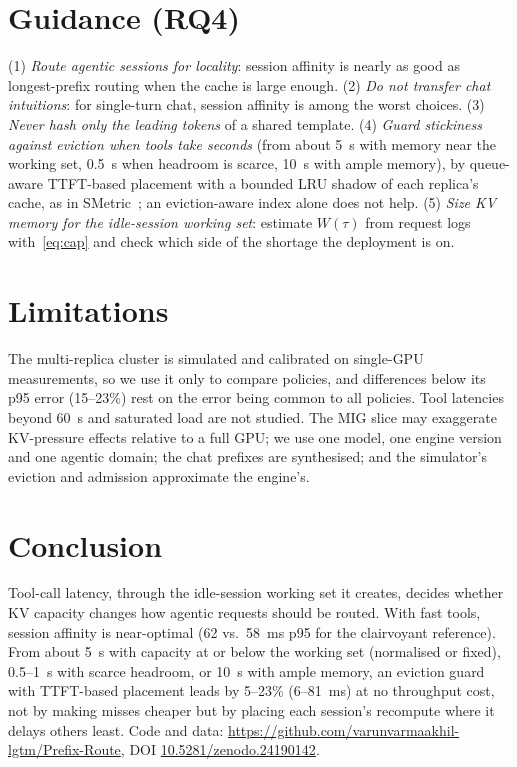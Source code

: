 \documentclass[conference]{IEEEtran}
\begin{document}
\section{Guidance (RQ4)}
\label{sec:guidance}

(1) \emph{Route agentic sessions for locality}: session affinity is nearly as good as longest-prefix routing when the cache is large enough. (2) \emph{Do not transfer chat intuitions}: for single-turn chat, session affinity is among the worst choices. (3) \emph{Never hash only the leading tokens} of a shared template. (4) \emph{Guard stickiness against eviction when tools take seconds} (from about 5~s with memory near the working set, 0.5~s when headroom is scarce, 10~s with ample memory), by queue-aware TTFT-based placement with a bounded LRU shadow of each replica's cache, as in SMetric~\cite{r8}; an eviction-aware index alone does not help. (5) \emph{Size KV memory for the idle-session working set}: estimate $W(\tau)$ from request logs with~\eqref{eq:cap} and check which side of the shortage the deployment is on.

\section{Limitations}
\label{sec:limits}

The multi-replica cluster is simulated and calibrated on single-GPU measurements, so we use it only to compare policies, and differences below its p95 error (15--23\%) rest on the error being common to all policies. Tool latencies beyond 60~s and saturated load are not studied. The MIG slice may exaggerate KV-pressure effects relative to a full GPU; we use one model, one engine version and one agentic domain; the chat prefixes are synthesised; and the simulator's eviction and admission approximate the engine's.

\section{Conclusion}
\label{sec:concl}

Tool-call latency, through the idle-session working set it creates, decides whether KV capacity changes how agentic requests should be routed. With fast tools, session affinity is near-optimal (62 vs.\ 58~ms p95 for the clairvoyant reference). From about 5~s with capacity at or below the working set (normalised or fixed), 0.5--1~s with scarce headroom, or 10~s with ample memory, an eviction guard with TTFT-based placement leads by 5--23\% (6--81~ms) at no throughput cost, not by making misses cheaper but by placing each session's recompute where it delays others least.
Code and data: \url{https://github.com/varunvarmaakhil-lgtm/Prefix-Route}, DOI \url{10.5281/zenodo.24190142}.
\end{document}
